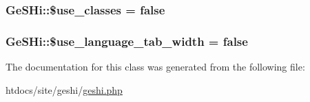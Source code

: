 \hypertarget{class_ge_s_hi_aac8c9944b3d19d37ed2d1f12dbe6ddc1}{
\subsubsection[{\$use\-\_\-classes}]{\setlength{\rightskip}{0pt plus 5cm}Ge\-S\-Hi\-::\$use\-\_\-classes = false}}\label{class_ge_s_hi_aac8c9944b3d19d37ed2d1f12dbe6ddc1}
\hypertarget{class_ge_s_hi_af0d15829de4298f614700c1e25dadc42}{
\subsubsection[{\$use\-\_\-language\-\_\-tab\-\_\-width}]{\setlength{\rightskip}{0pt plus 5cm}Ge\-S\-Hi\-::\$use\-\_\-language\-\_\-tab\-\_\-width = false}}\label{class_ge_s_hi_af0d15829de4298f614700c1e25dadc42}


The documentation for this class was generated from the following file\-:\begin{DoxyCompactItemize}
\item 
htdocs/site/geshi/\hyperlink{geshi_8php}{geshi.\-php}\end{DoxyCompactItemize}
